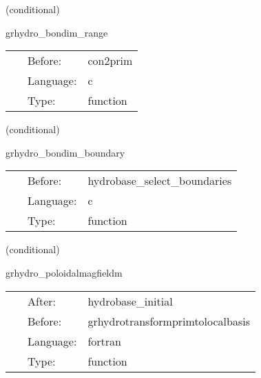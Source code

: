 \documentclass{article}
\begin{document}
\vspace{5mm}

   (conditional) 

\hspace{5mm} grhydro\_bondim\_range 

\hspace{5mm}{\it force analytic solution outside anulus } 


\hspace{5mm}

 \begin{tabular*}{160mm}{cll} 
~ & Before:  & con2prim \\ 
~ & Language:  & c \\ 
~ & Type:  & function \\ 
\end{tabular*} 


\vspace{5mm}

   (conditional) 

\hspace{5mm} grhydro\_bondim\_boundary 

\hspace{5mm}{\it force analytic solution in boundaries } 


\hspace{5mm}

 \begin{tabular*}{160mm}{cll} 
~ & Before:  & hydrobase\_select\_boundaries \\ 
~ & Language:  & c \\ 
~ & Type:  & function \\ 
\end{tabular*} 


\vspace{5mm}

   (conditional) 

\hspace{5mm} grhydro\_poloidalmagfieldm 

\hspace{5mm}{\it set up a poloidal magnetic field. it expects the other fluid variables already to be set, as for example in the tov solution } 


\hspace{5mm}

 \begin{tabular*}{160mm}{cll} 
~ & After:  & hydrobase\_initial \\ 
~ & Before:  & grhydrotransformprimtolocalbasis \\ 
~ & Language:  & fortran \\ 
~ & Type:  & function \\ 
\end{tabular*} 
\end{document}
